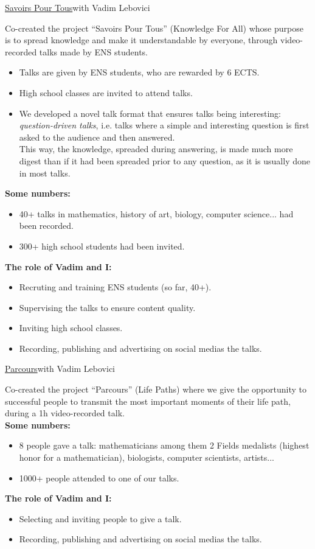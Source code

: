 \documentclass[colorlinks,linkcolor=true]{moderncv}
\begin{document}
{\href{https://sapt.fr}{Savoirs Pour Tous}}{with Vadim Lebovici}{}{}
{Co-created the project ``Savoirs Pour Tous'' (Knowledge For All) whose purpose is to spread knowledge and make it understandable by everyone, through video-recorded talks made by ENS students.
\begin{itemize}
    \item Talks are given by ENS students, who are rewarded by 6 ECTS.
    \item High school classes are invited to attend talks.
    \item We developed a novel talk format that ensures talks being interesting: \textit{question-driven talks}, i.e. talks where a simple and interesting question is first asked to the audience and then answered. \\
    This way, the knowledge, spreaded during answering, is made much more digest than if it had been spreaded prior to any question, as it is usually done in most talks.
\end{itemize}
\textbf{Some numbers:}
\begin{itemize}
    \item 40+ talks in mathematics, history of art, biology, computer science... had been recorded.
    \item 300+ high school students had been invited.
\end{itemize}
\textbf{The role of Vadim and I:}
\begin{itemize}
    \item Recruting and training ENS students (so far, 40+).
    \item Supervising the talks to ensure content quality.
    \item Inviting high school classes.
    \item Recording, publishing and advertising on social medias the talks.
\end{itemize}}

{\href{https://parcours.co}{Parcours}}{with Vadim Lebovici}{}{}{Co-created the project ``Parcours'' (Life Paths) where we give the opportunity to successful people to transmit the most important moments of their life path, during a 1h video-recorded talk. \\
\textbf{Some numbers:}
\begin{itemize}
    \item 8 people gave a talk: mathematicians among them 2 Fields medalists (highest honor for a mathematician), biologists, computer scientists, artists...
    \item 1000+ people attended to one of our talks.
\end{itemize}
\textbf{The role of Vadim and I:}
\begin{itemize}
    \item Selecting and inviting people to give a talk.
    \item Recording, publishing and advertising on social medias the talks.
\end{itemize}}
\end{document}
